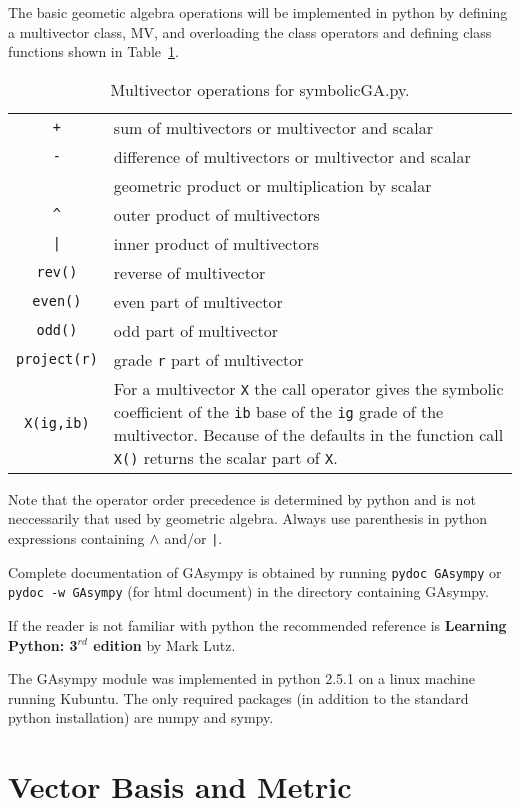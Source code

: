\documentclass{article}
\begin{document}
The basic geometic algebra operations will be implemented in python by defining a multivector 
class, MV, and overloading the class operators and defining class functions shown in Table~\ref{table1}.
\begin{table}[h!]
\begin{tabular}{cl}
	{\tt +} & sum of multivectors or multivector and scalar \\
	{\tt -} & difference of multivectors  or multivector and scalar \\
	{\tt *} & geometric product or multiplication by scalar \\
	{\tt \verb!^!} & outer product of multivectors \\
	{\tt |} & inner product of multivectors \\	
	{\tt rev()} & reverse of multivector \\
	{\tt even()} & even part of multivector \\
	{\tt odd()} & odd part of multivector \\
	{\tt project(r)} & grade {\tt r} part of multivector \\
	{\tt X(ig,ib)} & \parbox[t]{3.5in}{For a multivector {\tt X} the call operator gives the symbolic 
					  coefficient of the {\tt ib} base of the {\tt ig} grade of the 
                      multivector.  Because of the defaults in the function call {\tt X()} returns 
                      the scalar part of {\tt X}.}
\end{tabular}
\caption{Multivector operations for symbolicGA.py.}\label{table1}
\end{table}
Note that the operator order precedence is determined by python and is not neccessarily that used by 
geometric algebra. Always use parenthesis in python expressions containing {\tt $\wedge$} and/or {\tt |}.

Complete documentation of GAsympy is obtained by running {\tt pydoc GAsympy} or {\tt pydoc -w GAsympy} 
(for html document) in the directory containing GAsympy.

If the reader is not familiar with python the recommended reference is {\bf Learning Python: 3$^{rd}$ 
edition} by Mark Lutz.

The GAsympy module was implemented in python 2.5.1 on a linux machine running Kubuntu.  The only 
required packages (in addition to the standard python installation) are numpy and sympy.

\section{Vector Basis and Metric}
\end{document}
